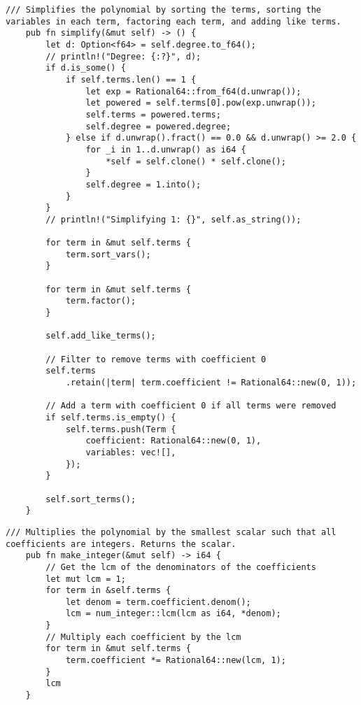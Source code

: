 \begin{lstlisting}[caption={The implementation of the \texttt{simplify()} method for the \texttt{Polynomial} struct}, label={lst:polynomial-simplify}]
    /// Simplifies the polynomial by sorting the terms, sorting the variables in each term, factoring each term, and adding like terms.
    pub fn simplify(&mut self) -> () {
        let d: Option<f64> = self.degree.to_f64();
        // println!("Degree: {:?}", d);
        if d.is_some() {
            if self.terms.len() == 1 {
                let exp = Rational64::from_f64(d.unwrap());
                let powered = self.terms[0].pow(exp.unwrap());
                self.terms = powered.terms;
                self.degree = powered.degree;
            } else if d.unwrap().fract() == 0.0 && d.unwrap() >= 2.0 {
                for _i in 1..d.unwrap() as i64 {
                    *self = self.clone() * self.clone();
                }
                self.degree = 1.into();
            }
        }
        // println!("Simplifying 1: {}", self.as_string());

        for term in &mut self.terms {
            term.sort_vars();
        }

        for term in &mut self.terms {
            term.factor();
        }

        self.add_like_terms();

        // Filter to remove terms with coefficient 0
        self.terms
            .retain(|term| term.coefficient != Rational64::new(0, 1));

        // Add a term with coefficient 0 if all terms were removed
        if self.terms.is_empty() {
            self.terms.push(Term {
                coefficient: Rational64::new(0, 1),
                variables: vec![],
            });
        }

        self.sort_terms();
    }
\end{lstlisting}

\begin{lstlisting}[caption={The implementation of the \texttt{make\_integer()} method for the \texttt{Polynomial} struct}, label={lst:polynomial-make-integer}]
    /// Multiplies the polynomial by the smallest scalar such that all coefficients are integers. Returns the scalar.
    pub fn make_integer(&mut self) -> i64 {
        // Get the lcm of the denominators of the coefficients
        let mut lcm = 1;
        for term in &self.terms {
            let denom = term.coefficient.denom();
            lcm = num_integer::lcm(lcm as i64, *denom);
        }
        // Multiply each coefficient by the lcm
        for term in &mut self.terms {
            term.coefficient *= Rational64::new(lcm, 1);
        }
        lcm
    }
\end{lstlisting}

